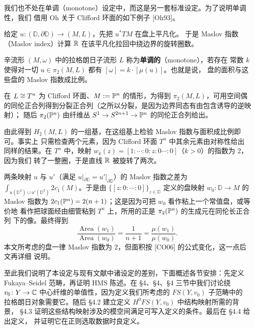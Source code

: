 \begin{example}[非单调]\label{ex:4-1-2}
我们也不处在单调（monotone）设定中，而这是另一套标准设定。为了说明单调性，我们
借用 Oh 关于 Clifford 环面的如下例子 [Oh93]。
\end{example}

\begin{definition}\label{def:4-1-3}
给定 $u\colon(\mathbb{D},\partial\mathbb{D})\to(M,L)$，先把 $u^*TM$ 在盘上平凡化。
于是 Maslov 指数（Maslov index）计算 $\mathbb{R}$ 在该平凡化拉回中绕边界的旋转圈数。
\end{definition}

\begin{definition}\label{def:4-1-4}
辛流形 $(M,\omega)$ 中的拉格朗日子流形 $L$ 称为\textbf{单调的}（monotone），若存在
常数 $k$ 使得对一切 $u\in\pi_2(M,L)$ 都有 $[\omega]=k\cdot[\mu(u)]$。也就是说，
盘的面积与这些盘的 Maslov 指数成比例。
\end{definition}


在 $L\cong T^n$ 为 Clifford 环面、$M:=\mathbb{P}^n$ 的情形，为得到 $\pi_2(M,L)$，可用空间偶
的同伦正合列得到分裂正合列（之所以分裂，是因为边界同态有由包含诱导的逆映射）；
随后 $\pi_2(\mathbb{P}^n)$ 由纤维丛 $S^1\to S^{2n+1}\to\mathbb{P}^n$ 的同伦正合列给出。

由此得到 $H_2(M,L)$ 的一组基，在这组基上检验 Maslov 指数与面积成比例即可。事实上
只需检查两个元素，因为 Clifford 环面 $T^n$ 中其余元素由对称性给出同样的结果。在
$T^n$ 中，映射 $w_k(z)=[1:\cdots:0:z:0\cdots:0]$（$k>0$）的指数为 $2$，因为我们
转了一整圈，于是直线 $\mathbb{R}$ 被旋转了两次。

两条映射 $u$ 与 $u'$（满足 $u|_{\partial\mathbb{D}}=u'|_{\partial\mathbb{D}}$）的
Maslov 指数之差为 $\int_{u(\mathbb{D}^2)\cup u'(\mathbb{D}^2)}2c_1(M)$。于是由
$\{[z:0:\cdots:0]\}_{z\in\mathbb{D}}$ 定义的盘映射 $w_0\colon\mathbb{D}\to M$ 的
Maslov 指数为 $2c_1(\mathbb{P}^n)=2(n+1)$；这是因为可把 $w_0$ 看作粘上一个常值盘，或等价地
看作把球面经由细管粘到 $T^n$ 上，所用的正是 $\pi_2(\mathbb{P}^n)$ 的生成元在同伦长正合列
下的像。最终得到
\[
\frac{\operatorname{Area}(w_1)}{\operatorname{Area}(w_0)}
=\frac{1}{n+1}=\frac{\mu(w_1)}{\mu(w_0)}.
\]
本文所考虑的盘一律 Maslov 指数为 $2$，但面积按 [CO06] 的公式变化，这一点后文再详细
说明。

至此我们说明了本设定与现有文献中诸设定的差别，下面概述各节安排：先定义
Fukaya--Seidel 范畴，再证明 HMS 陈述。在 §4、§4、§4 三节中我们讨论绕
$v_0\colon Y\to\mathbb{C}$ 中心纤维的单值性，因为定义我们所考虑的 $FS(Y,v_0)$ 子范畴中的
拉格朗日对象需要它。随后 §4.2 建立定义 $H^0FS(Y,v_0)$ 中结构映射所需的背景，
§4.3 证明这些结构映射涉及的模空间满足可写入定义的条件。最后在 §4.4 给出定义，
并证明它在正则选取数据时良定义。

